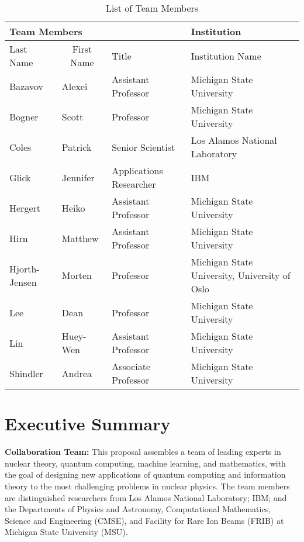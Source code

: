 \documentclass[10pt]{article}
\begin{document}
\begin{table}[hbtp]
\caption{List of Team Members}
\begin{center}
\begin{tabular}{|l|l|l|l|}
\hline
\multicolumn{3}{|l}{{\bf Team Members} } & \multicolumn{1}{|l|}{{\bf Institution}}\\
\hline
\multicolumn{1}{|l}{Last Name} & \multicolumn{1}{|c|}{First Name} & \multicolumn{1}{l|}{Title} & \multicolumn{1}{l|}{Institution Name} \\
\hline
Bazavov & Alexei & Assistant Professor & Michigan State University \\
\hline
Bogner & Scott & Professor & Michigan State University \\
\hline
Coles & Patrick & Senior Scientist & Los Alamos National Laboratory \\
\hline
Glick & Jennifer & Applications Researcher & IBM \\
\hline
Hergert & Heiko & Assistant Professor & Michigan State University \\
\hline
Hirn & Matthew & Assistant Professor & Michigan State University \\
\hline
Hjorth-Jensen & Morten & Professor & Michigan State University, University of Oslo\\
\hline
Lee & Dean & Professor & Michigan State University \\
\hline
Lin & Huey-Wen & Assistant Professor & Michigan State University \\
\hline
Shindler & Andrea & Associate Professor & Michigan State University \\
\hline

\end{tabular}
\end{center}
\end{table}

\newpage
\section{Executive Summary}


{\bf Collaboration Team:} This proposal assembles a team of leading experts 
in nuclear theory, quantum computing, machine learning, and mathematics, with 
the goal of designing new applications of quantum computing and information theory 
to the most challenging problems in nuclear physics. The team members are 
distinguished researchers from Los Alamos National Laboratory; IBM; and the 
Departments of Physics and Astronomy, Computational Mathematics, Science and 
Engineering (CMSE), and Facility for Rare Ion Beams (FRIB) at 
Michigan State University (MSU).
\end{document}
